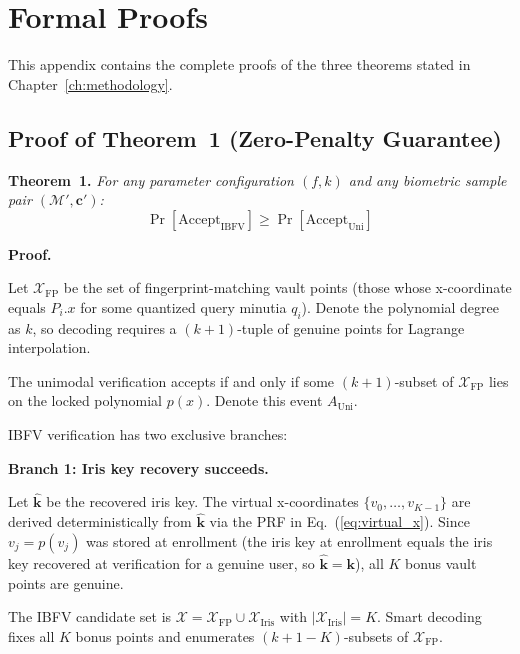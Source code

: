 \chapter{Formal Proofs}
\label{appn:A}

This appendix contains the complete proofs of the three theorems stated in
Chapter~\ref{ch:methodology}.

\section{Proof of Theorem~1 (Zero-Penalty Guarantee)}
\label{sec:proof_thm1}

\noindent\textbf{Theorem~1.} \textit{For any parameter configuration $(f, k)$ and
any biometric sample pair $(\mathcal{M}', \mathbf{c}')$:}
\begin{equation}
  \Pr[\mathrm{Accept}_{\mathrm{IBFV}}] \geq \Pr[\mathrm{Accept}_{\mathrm{Uni}}]
\end{equation}

\noindent\textbf{Proof.}

Let $\mathcal{X}_{\mathrm{FP}}$ be the set of fingerprint-matching vault points
(those whose x-coordinate equals $P_i.x$ for some quantized query minutia $q_i$).
Denote the polynomial degree as $k$, so decoding requires a $(k{+}1)$-tuple of
genuine points for Lagrange interpolation.

The unimodal verification accepts if and only if some $(k{+}1)$-subset of
$\mathcal{X}_{\mathrm{FP}}$ lies on the locked polynomial $p(x)$. Denote this
event $A_\mathrm{Uni}$.

IBFV verification has two exclusive branches:

\textbf{Branch 1: Iris key recovery succeeds.}

Let $\hat{\mathbf{k}}$ be the recovered iris key. The virtual x-coordinates
$\{v_0, \ldots, v_{K-1}\}$ are derived deterministically from $\hat{\mathbf{k}}$
via the PRF in Eq.~(\ref{eq:virtual_x}). Since $v_j = p(v_j)$ was stored at
enrollment (the iris key at enrollment equals the iris key recovered at
verification for a genuine user, so $\hat{\mathbf{k}} = \mathbf{k}$), all $K$
bonus vault points are genuine.

The IBFV candidate set is $\mathcal{X} = \mathcal{X}_{\mathrm{FP}} \cup
\mathcal{X}_{\mathrm{Iris}}$ with $|\mathcal{X}_{\mathrm{Iris}}| = K$.
Smart decoding fixes all $K$ bonus points and enumerates $(k{+}1{-}K)$-subsets
of $\mathcal{X}_{\mathrm{FP}}$.

